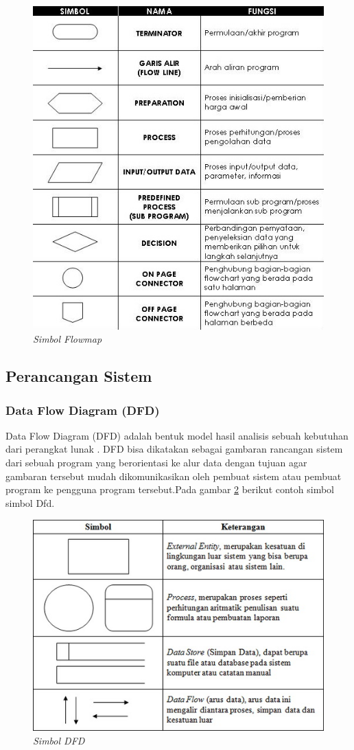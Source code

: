 \begin{figure}[!htbp]
    \centering
    \includegraphics[scale=0.8]{figure/flowmapp.JPG}
    \caption{\textit{Simbol Flowmap}}
    \label{gambar 2}
\end{figure}
\vspace{4cm}
\subsection{Perancangan Sistem}
\subsubsection{Data Flow Diagram (DFD)}
Data Flow Diagram (DFD) adalah bentuk model hasil analisis sebuah kebutuhan dari perangkat lunak \cite{rivai2013pembangunan}. DFD bisa dikatakan sebagai gambaran rancangan sistem dari sebuah program yang berorientasi ke alur data dengan tujuan agar gambaran tersebut mudah dikomunikasikan oleh pembuat sistem atau pembuat program ke pengguna program tersebut.Pada gambar \ref{gambar 3} berikut contoh simbol simbol Dfd.

\begin{figure}[!htbp]
    \centering
    \includegraphics[scale=0.9]{figure/dfd.jpg}
    \caption{\textit{Simbol DFD}}
    \label{gambar 3}
\end{figure}


